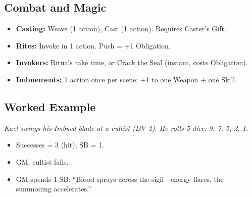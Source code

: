 \subsection{Combat and Magic}
\begin{itemize}
  \item \textbf{Casting:} Weave (1 action), Cast (1 action). Requires Caster’s Gift.
  \item \textbf{Rites:} Invoke in 1 action. Push = +1 Obligation.
  \item \textbf{Invokers:} Rituals take time, or Crack the Seal (instant, costs Obligation).
  \item \textbf{Imbuements:} 1 action once per scene; +1 to one Weapon + one Skill.
\end{itemize}

\subsection{Worked Example}
\emph{Kael swings his Imbued blade at a cultist (DV 2). He rolls 5 dice: 9, 7, 5, 2, 1.}
\begin{itemize}
  \item Successes = 3 (hit), SB = 1.
  \item GM: cultist falls.
  \item GM spends 1 SB: ``Blood sprays across the sigil—energy flares, the summoning accelerates.''
\end{itemize}